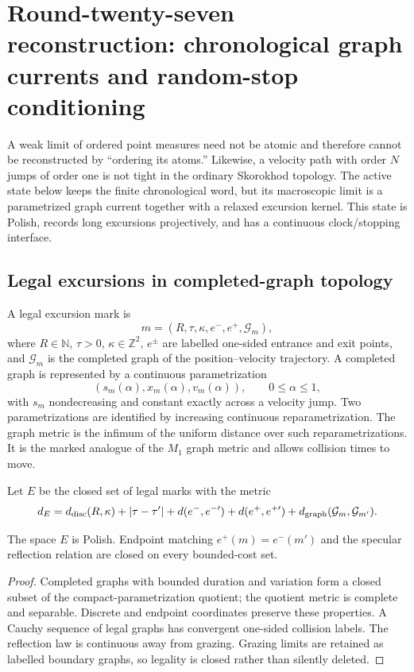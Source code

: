 \section{Round-twenty-seven reconstruction: chronological graph currents and random-stop conditioning}
\label{sec:r27-a3}

A weak limit of ordered point measures need not be atomic and therefore cannot
be reconstructed by ``ordering its atoms.''  Likewise, a velocity path with
order $N$ jumps of order one is not tight in the ordinary Skorokhod topology.
The active state below keeps the finite chronological word, but its macroscopic
limit is a parametrized graph current together with a relaxed excursion
kernel.  This state is Polish, records long excursions projectively, and has
a continuous clock/stopping interface.

\subsection{Legal excursions in completed-graph topology}

A legal excursion mark is
\[
 m=(R,\tau,\kappa,e^-,e^+,\mathcal G_m),
\]
where $R\in\mathbb N$, $\tau>0$, $\kappa\in\mathbb Z^2$, $e^\pm$ are labelled
one-sided entrance and exit points, and $\mathcal G_m$ is the completed graph
of the position--velocity trajectory.  A completed graph is represented by a
continuous parametrization
\[
 (s_m(\alpha),x_m(\alpha),v_m(\alpha)),\qquad 0\le\alpha\le1,
\]
with $s_m$ nondecreasing and constant exactly across a velocity jump.  Two
parametrizations are identified by increasing continuous reparametrization.
The graph metric is the infimum of the uniform distance over such
reparametrizations.  It is the marked analogue of the $M_1$ graph metric and
allows collision times to move.

Let $E$ be the closed set of legal marks with the metric
\[
 d_E=d_{\rm disc}(R,\kappa)+|\tau-\tau'|
     +d(e^-,e^{-\prime})+d(e^+,e^{+\prime})
     +d_{\rm graph}(\mathcal G_m,\mathcal G_{m'}).
\]

\begin{lemma}
\label{lem:r27-a3-polish-mark}
The space $E$ is Polish.  Endpoint matching
$e^+(m)=e^-(m')$ and the specular reflection relation are closed on every
bounded-cost set.
\end{lemma}

\begin{proof}
Completed graphs with bounded duration and variation form a closed subset of
the compact-parametrization quotient; the quotient metric is complete and
separable.  Discrete and endpoint coordinates preserve these properties.
A Cauchy sequence of legal graphs has convergent one-sided collision labels.
The reflection law is continuous away from grazing.  Grazing limits are
retained as labelled boundary graphs, so legality is closed rather than
silently deleted.
\end{proof}

